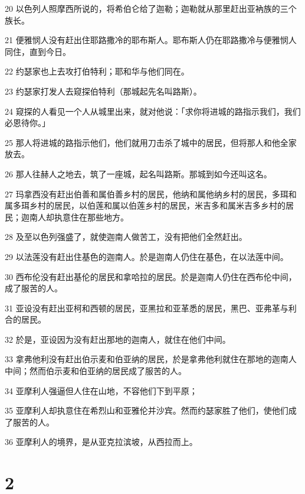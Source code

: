 \par 20 以色列人照摩西所说的，将希伯仑给了迦勒；迦勒就从那里赶出亚衲族的三个族长。
\par 21 便雅悯人没有赶出住耶路撒冷的耶布斯人。耶布斯人仍在耶路撒冷与便雅悯人同住，直到今日。
\par 22 约瑟家也上去攻打伯特利；耶和华与他们同在。
\par 23 约瑟家打发人去窥探伯特利（那城起先名叫路斯）。
\par 24 窥探的人看见一个人从城里出来，就对他说：「求你将进城的路指示我们，我们必恩待你。」
\par 25 那人将进城的路指示他们，他们就用刀击杀了城中的居民，但将那人和他全家放去。
\par 26 那人往赫人之地去，筑了一座城，起名叫路斯。那城到如今还叫这名。
\par 27 玛拿西没有赶出伯善和属伯善乡村的居民，他纳和属他纳乡村的居民，多珥和属多珥乡村的居民，以伯莲和属以伯莲乡村的居民，米吉多和属米吉多乡村的居民；迦南人却执意住在那些地方。
\par 28 及至以色列强盛了，就使迦南人做苦工，没有把他们全然赶出。
\par 29 以法莲没有赶出住基色的迦南人。於是迦南人仍住在基色，在以法莲中间。
\par 30 西布伦没有赶出基伦的居民和拿哈拉的居民。於是迦南人仍住在西布伦中间，成了服苦的人。
\par 31 亚设没有赶出亚柯和西顿的居民，亚黑拉和亚革悉的居民，黑巴、亚弗革与利合的居民。
\par 32 於是，亚设因为没有赶出那地的迦南人，就住在他们中间。
\par 33 拿弗他利没有赶出伯示麦和伯亚纳的居民，於是拿弗他利就住在那地的迦南人中间；然而伯示麦和伯亚纳的居民成了服苦的人。
\par 34 亚摩利人强逼但人住在山地，不容他们下到平原；
\par 35 亚摩利人却执意住在希烈山和亚雅伦并沙宾。然而约瑟家胜了他们，使他们成了服苦的人。
\par 36 亚摩利人的境界，是从亚克拉滨坡，从西拉而上。

\chapter{2}

